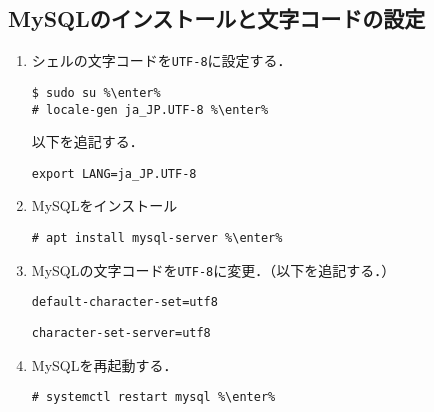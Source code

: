 \documentclass{jlreq}
\begin{document}
\subsection{MySQLのインストールと文字コードの設定}
\begin{enumerate}
    \item シェルの文字コードを\texttt{UTF-8}に設定する．
          \begin{lstlisting}
$ sudo su %\enter%
# locale-gen ja_JP.UTF-8 %\enter%
\end{lstlisting}
          以下を追記する．
          \begin{lstlisting}[style=file,caption={\ttfamily \~\ /.bashrc}]
export LANG=ja_JP.UTF-8
\end{lstlisting}
    \item MySQLをインストール
          \begin{lstlisting}
# apt install mysql-server %\enter%
\end{lstlisting}
    \item MySQLの文字コードを\texttt{UTF-8}に変更．（以下を追記する．）
          \begin{lstlisting}[style=file,caption={\ttfamily /etc/mysql/conf.d/mysql.cnf}]
default-character-set=utf8
\end{lstlisting}
          \begin{lstlisting}[style=file,caption={\ttfamily /etc/mysql/mysql.conf.d/mysqld.cnf}]
character-set-server=utf8    
\end{lstlisting}
    \item MySQLを再起動する．
          \begin{lstlisting}
# systemctl restart mysql %\enter%
\end{lstlisting}
\end{enumerate}
\end{document}
